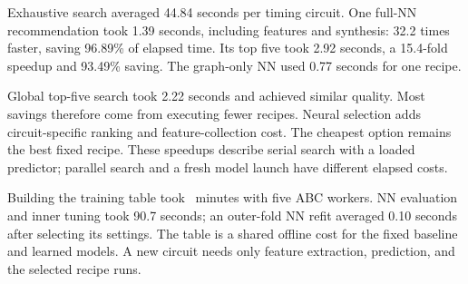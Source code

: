 Exhaustive search averaged 44.84 seconds per timing circuit. One full-NN recommendation took 1.39 seconds, including features and synthesis: 32.2 times faster, saving 96.89\% of elapsed time. Its top five took 2.92 seconds, a 15.4-fold speedup and 93.49\% saving. The graph-only NN used 0.77 seconds for one recipe.

Global top-five search took 2.22 seconds and achieved similar quality. Most savings therefore come from executing fewer recipes. Neural selection adds circuit-specific ranking and feature-collection cost. The cheapest option remains the best fixed recipe. These speedups describe serial search with a loaded predictor; parallel search and a fresh model launch have different elapsed costs.

Building the training table took \SweepMinutes\ minutes with five ABC workers. NN evaluation and inner tuning took 90.7 seconds; an outer-fold NN refit averaged 0.10 seconds after selecting its settings. The table is a shared offline cost for the fixed baseline and learned models. A new circuit needs only feature extraction, prediction, and the selected recipe runs.
